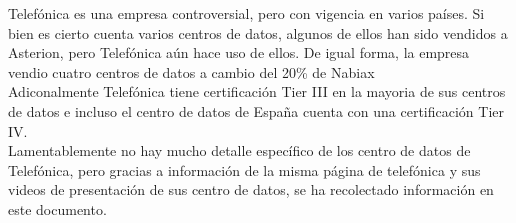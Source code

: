 \documentclass{article}
\begin{document}
Telefónica es una empresa controversial, pero con vigencia en varios países. Si bien es cierto cuenta varios centros de datos, algunos de ellos han sido vendidos a Asterion, pero Telefónica aún hace uso de ellos. De igual forma, la empresa vendio cuatro centros de datos a cambio del 20\% de Nabiax\\

Adiconalmente Telefónica tiene certificación  Tier III en la mayoria de sus centros de datos e incluso el centro de datos de España cuenta con una certificación Tier IV.  \\

Lamentablemente no hay mucho detalle específico de los centro de datos de Telefónica, pero gracias a información de la misma página de telefónica y sus videos de presentación de sus centro de datos, se ha recolectado información en este documento. \\

	
	


%


	
	
	
	
\end{document}
